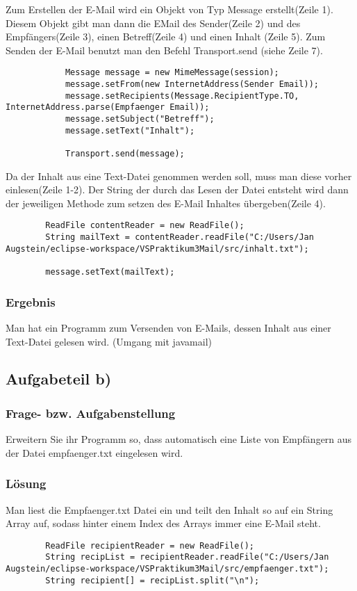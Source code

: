 Zum Erstellen der E-Mail wird ein Objekt von Typ Message erstellt(Zeile 1). Diesem Objekt gibt man dann die EMail des Sender(Zeile 2) und des Empfängers(Zeile 3), einen Betreff(Zeile 4) und einen Inhalt (Zeile 5). Zum Senden der E-Mail benutzt man den Befehl Transport.send (siehe Zeile 7).
\begin{lstlisting}
			Message message = new MimeMessage(session);
			message.setFrom(new InternetAddress(Sender Email));
			message.setRecipients(Message.RecipientType.TO, InternetAddress.parse(Empfaenger Email));
			message.setSubject("Betreff");
			message.setText("Inhalt");
			
			Transport.send(message);
\end{lstlisting}


Da der Inhalt aus eine Text-Datei genommen werden soll, muss man diese vorher einlesen(Zeile 1-2). Der String der durch das Lesen der Datei entsteht wird dann der jeweiligen Methode zum setzen des E-Mail Inhaltes übergeben(Zeile 4).
\begin{lstlisting}
		ReadFile contentReader = new ReadFile();
		String mailText = contentReader.readFile("C:/Users/Jan Augstein/eclipse-workspace/VSPraktikum3Mail/src/inhalt.txt");
		
		message.setText(mailText);
\end{lstlisting}

\subsubsection{Ergebnis}
Man hat ein Programm zum Versenden von E-Mails, dessen Inhalt aus einer Text-Datei gelesen wird. (Umgang mit javamail)

\subsection{Aufgabeteil b)}
\subsubsection{Frage- bzw. Aufgabenstellung}
 Erweitern Sie ihr Programm so, dass automatisch eine Liste von Empfängern aus der Datei empfaenger.txt eingelesen wird.
 
\subsubsection{Lösung}
Man liest die Empfaenger.txt Datei ein und teilt den Inhalt so auf ein String Array auf, sodass hinter einem Index des Arrays immer eine E-Mail steht. 
\begin{lstlisting}
		ReadFile recipientReader = new ReadFile();
		String recipList = recipientReader.readFile("C:/Users/Jan Augstein/eclipse-workspace/VSPraktikum3Mail/src/empfaenger.txt");
		String recipient[] = recipList.split("\n");
\end{lstlisting} 


